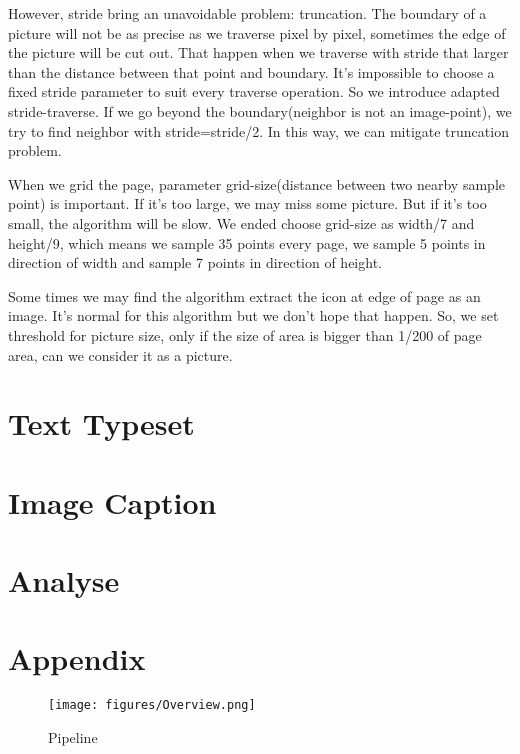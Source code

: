 \documentclass{article}
\begin{document}
However, stride bring an unavoidable problem: truncation. The boundary of a picture will not be as precise as we traverse pixel by pixel, sometimes the edge of the picture will be cut out. That happen when we traverse with stride that larger than the distance between that point and boundary. It's impossible to choose a fixed stride parameter to suit every traverse operation. So we introduce adapted stride-traverse. If we go beyond the boundary(neighbor is not an image-point), we try to find neighbor with stride=stride/2. In this way, we can mitigate truncation problem. 

When we grid the page, parameter grid-size(distance between two nearby sample point) is important. If it's too large, we may miss some picture. But if it's too small, the algorithm will be slow. We ended choose grid-size as width/7 and height/9, which means we sample 35 points every page, we sample 5 points in direction of width and sample 7 points in direction of height. 

Some times we may find the algorithm extract the icon at edge of page as an image. It's normal for this algorithm but we don't hope that happen. So, we set threshold for picture size, only if the size of area is bigger than 1/200 of page area, can we consider it as a picture. 
\section{Text Typeset}

\section{Image Caption}


\section{Analyse}





\appendix

\section{Appendix}
\begin{figure}
    \centering
    \texttt{[image: figures/Overview.png]}
    \caption{Pipeline}
    \label{fig:fig1}
\end{figure}
\end{document}
